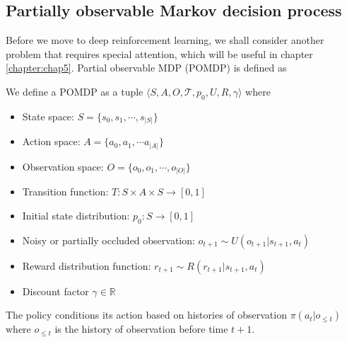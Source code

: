 \subsection{Partially observable Markov decision process}
Before we move to deep reinforcement learning, we shall consider another problem that requires special attention, which will be useful in chapter \ref{chapter:chap5}. Partial observable MDP (POMDP) is defined as 
\begin{definition}
    We define a POMDP as a tuple $\langle S, A, O, \mathcal{T}, p_0, U, R, \gamma\rangle$ where
    \begin{itemize}
        \item State space: $S = \{s_0, s_1, \cdots , s_{|S|}\}$
        \item Action space: $A = \{a_0, a_1, \cdots a_{|A|}\}$
        \item Observation space: $O = \{o_0, o_1, \cdots, o_{|O|}\}$
        \item Transition function: $T: S \times A \times S \rightarrow [0, 1]$
        \item Initial state distribution: $p_0 : S \rightarrow [0, 1]$
        \item Noisy or partially occluded observation: $o_{t+1} \sim U(o_{t+1} | s_{t+1}, a_t)$
        \item Reward distribution function: $r_{t+ 1} \sim R(r_{t+1} | s_{t+1}, a_t)$
        \item Discount factor $\gamma \in \mathbb{R}$ 
    \end{itemize}
    The policy conditions its action based on histories of observation $\pi(a_t | o_{\le t})$ where $o_{\le t}$ is the history of observation before time $t+1$. 
\end{definition}